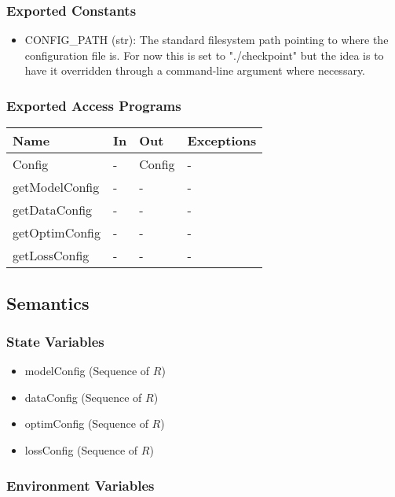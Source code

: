 \documentclass[12pt, titlepage]{article}
\begin{document}
\subsubsection{Exported Constants}
\begin{itemize}
  \item CONFIG\_PATH (str): The standard filesystem path pointing to where the configuration file is. For now this is set to "./checkpoint" but the idea is to have it overridden through a command-line argument where necessary.  
\end{itemize}


\subsubsection{Exported Access Programs}

\begin{center}
\begin{tabular}{p{3cm}|p{5cm}|p{2cm}|p{2cm}}
\hline
\textbf{Name} & \textbf{In} & \textbf{Out} & \textbf{Exceptions} \\
\hline
Config & - & Config & - \\
\hline
getModelConfig & - & - & - \\
\hline
getDataConfig & - & - & - \\
\hline
getOptimConfig & - & - & - \\
\hline
getLossConfig & - & - & - \\
\hline
\end{tabular}
\end{center}

\subsection{Semantics}

\subsubsection{State Variables}

\begin{itemize}
  \item modelConfig (Sequence of $R$)
  \item dataConfig (Sequence of $R$)
  \item optimConfig (Sequence of $R$)
  \item lossConfig (Sequence of $R$)
\end{itemize}

\subsubsection{Environment Variables}
\end{document}
